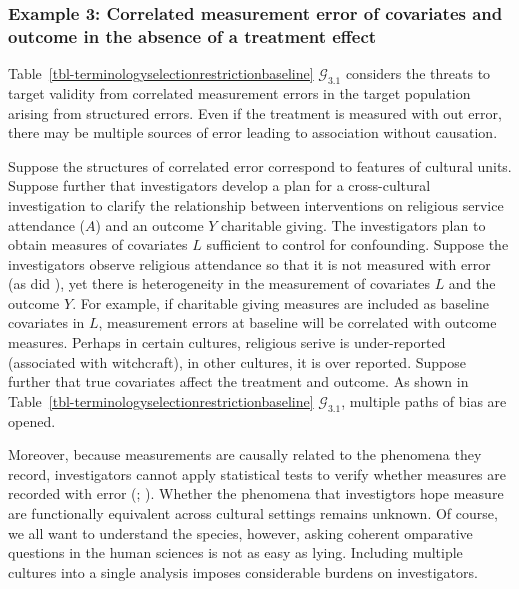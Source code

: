 \documentclass[
  single column]{article}
\begin{document}
\subsubsection{Example 3: Correlated measurement error of covariates and
outcome in the absence of a treatment
effect}\label{example-3-correlated-measurement-error-of-covariates-and-outcome-in-the-absence-of-a-treatment-effect}

Table~\ref{tbl-terminologyselectionrestrictionbaseline}
\(\mathcal{G}_{3.1}\) considers the threats to target validity from
correlated measurement errors in the target population arising from
structured errors. Even if the treatment is measured with out error,
there may be multiple sources of error leading to association without
causation.

Suppose the structures of correlated error correspond to features of
cultural units. Suppose further that investigators develop a plan for a
cross-cultural investigation to clarify the relationship between
interventions on religious service attendance (\(A\)) and an outcome
\(Y\) charitable giving. The investigators plan to obtain measures of
covariates \(L\) sufficient to control for confounding. Suppose the
investigators observe religious attendance so that it is not measured
with error (as did ), yet there is heterogeneity in the measurement of covariates
\(L\) and the outcome \(Y\). For example, if charitable giving measures
are included as baseline covariates in \(L\), measurement errors at
baseline will be correlated with outcome measures. Perhaps in certain
cultures, religious serive is under-reported (associated with
witchcraft), in other cultures, it is over reported. Suppose further
that true covariates affect the treatment and outcome. As shown in
Table~\ref{tbl-terminologyselectionrestrictionbaseline}
\(\mathcal{G}_{3.1}\), multiple paths of bias are opened.

Moreover, because measurements are causally related to the phenomena
they record, investigators cannot apply statistical tests to verify
whether measures are recorded with error
(;
). Whether
the phenomena that investigtors hope measure are functionally equivalent
across cultural settings remains unknown. Of course, we all want to
understand the species, however, asking coherent omparative questions in
the human sciences is not as easy as lying. Including multiple cultures
into a single analysis imposes considerable burdens on investigators.
\end{document}
